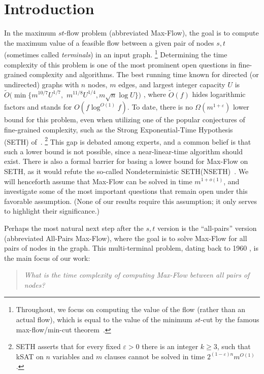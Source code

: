 \documentclass{toc}
\theoremstyle{plain}
\newcommand{\ProblemName}[1]{\textsf{#1}}
\newcommand{\MF}{\ProblemName{Max-Flow}\xspace}
\newcommand{\SETH}{SETH\xspace}
\newcommand{\NSETH}{NSETH\xspace}
\newcommand{\APMF}{\ProblemName{All-Pairs Max-Flow}\xspace}
\newcommand\eps{\varepsilon}
\newcommand\tO{\ensuremath{\widetilde O}}  %
\begin{document}
%
%
%

%
\section{Introduction}

In the maximum $st$-flow problem (abbreviated \MF),
the goal is to compute the maximum value of a feasible flow
%
between a given pair of nodes $s,t$ (sometimes called \emph{terminals})
in an input graph.%
\footnote{Throughout, we focus on computing the value of the flow
  (rather than an actual flow),
  which is equal to the value of the minimum $st$-cut
  by the famous max-flow/min-cut theorem~\cite{FF56}.
}
%
Determining the time complexity of this problem is one of the most prominent open questions in fine-grained complexity and algorithms.
The best running time known for directed (or undirected)
graphs with $n$ nodes, $m$ edges, and largest integer capacity $U$ is
$\tO(\min\{m^{10/7}U^{1/7},$ $m^{11/8} U^{1/4}, m \sqrt{n}\log U\})$ \cite{Madry16,LS19,lee2014path},
where %
%
%
$\tO(f)$ hides logarithmic factors
and stands for $O(f \log^{O(1)} f)$.
To date, there is no $\Omega(m^{1+\eps})$  lower bound for this problem,
even when utilizing one of the popular conjectures of fine-grained complexity,
such as the Strong Exponential-Time Hypothesis (\SETH) of~\cite{ImpaSETH}.%
\footnote{\SETH asserts that for every fixed $\varepsilon>0$
  there is an integer $k\geq 3$,
  such that kSAT on $n$ variables and $m$ clauses
  cannot be solved in time $2^{(1-\varepsilon)n} m^{O(1)}$.
}
This gap is
%
debated among experts,
and a common belief is that such a lower bound is not possible,
since a near-linear-time algorithm
%
%
should exist.  %
There is also a formal barrier for basing a lower bound for \MF on \SETH,
  as it would refute the so-called
%
%
Nondeterministic
\SETH (\NSETH)~\cite{carmosino2016nondeterministic}.
We will henceforth assume that \MF can be solved in time $m^{1+o(1)}$,
and investigate some of the most important questions that remain open under this favorable assumption.
(None of our results
%
require  %
this assumption; it only serves
%
%
%
%
to highlight their
%
significance.)

Perhaps the most natural
%
next step   %
after the $s,t$ version is the ``all-pairs'' version (abbreviated \APMF),
where the goal is to solve \MF for all pairs of nodes in the graph.
This multi-terminal problem, dating back to 1960 \cite{Mayeda60,Chien60},
is the main focus of our work:
\begin{quotation}
\emph{What is the time complexity of computing \MF between all pairs of nodes?}
\end{quotation}
\end{document}
